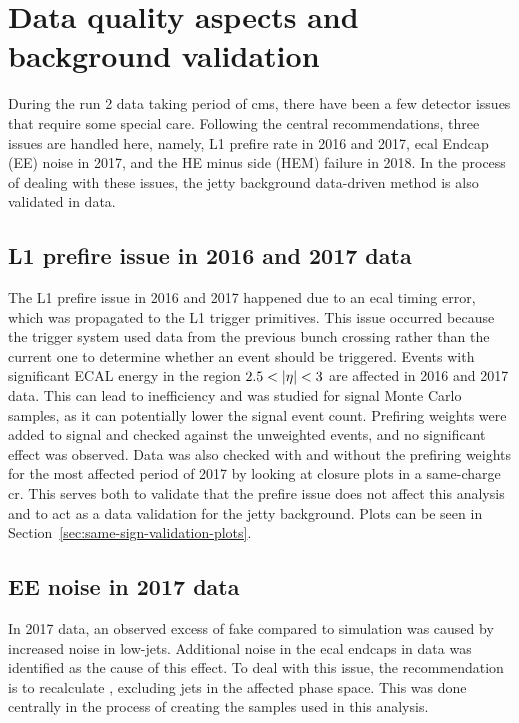 \clearpage
\section{Data quality aspects and background validation}
\label{sec:data-quality}

During the run 2 data taking period of \gls{cms}, there have been a few detector issues that require some special care. Following the central recommendations, three issues are handled here, namely, L1 prefire rate in 2016 and 2017, \gls{ecal} Endcap (EE) noise in 2017, and the HE minus side (HEM) failure in 2018. In the process of dealing with these issues, the jetty background data-driven method is also validated in data. 

\subsection{L1 prefire issue in 2016 and 2017 data}

The L1 prefire issue in 2016 and 2017 happened due to an \gls{ecal} timing error, which was propagated to the L1 trigger primitives. This issue occurred because the trigger system used data from the previous bunch crossing rather than the current one to determine whether an event should be triggered. Events with significant ECAL energy in the region $2.5<\lvert \eta \rvert<3$ are affected in 2016 and 2017 data. This can lead to inefficiency and was studied for signal Monte Carlo samples, as it can potentially lower the signal event count. Prefiring weights were added to signal and checked against the unweighted events, and no significant effect was observed. Data was also checked with and without the prefiring weights for the most affected period of 2017 by looking at closure plots in a same-charge \gls{cr}. This serves both to validate that the prefire issue does not affect this analysis and to act as a data validation for the jetty background. Plots can be seen in Section~\ref{sec:same-sign-validation-plots}.

\subsection{EE noise in 2017 data}

In 2017 data, an observed excess of fake \ptmiss compared to simulation was caused by increased noise in low-\pt jets. Additional noise in the \gls{ecal} endcaps in data was identified as the cause of this effect. To deal with this issue, the recommendation is to recalculate \ptmiss, excluding jets in the affected phase space. This was done centrally in the process of creating the samples used in this analysis.


